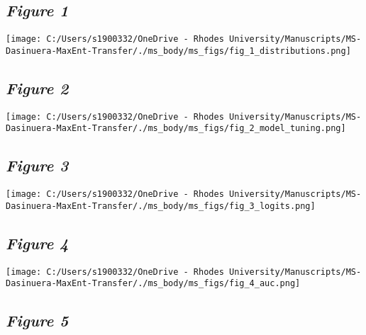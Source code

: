 \documentclass[12pt,]{article}
\begin{document}
\setlength{\parindent}{-0.2in}
\setlength{\leftskip}{0.2in}
\setlength{\parskip}{8pt}
\vspace*{-0.2in}

\noindent

\newpage

\hypertarget{figure-1}{%
\subsection{\texorpdfstring{\emph{Figure 1}}{Figure 1}}\label{figure-1}}

\texttt{[image: C:/Users/s1900332/OneDrive - Rhodes University/Manuscripts/MS-Dasinuera-MaxEnt-Transfer/./ms\_body/ms\_figs/fig\_1\_distributions.png]}

\newpage

\hypertarget{figure-2}{%
\subsection{\texorpdfstring{\emph{Figure 2}}{Figure 2}}\label{figure-2}}

\texttt{[image: C:/Users/s1900332/OneDrive - Rhodes University/Manuscripts/MS-Dasinuera-MaxEnt-Transfer/./ms\_body/ms\_figs/fig\_2\_model\_tuning.png]}

\newpage

\hypertarget{figure-3}{%
\subsection{\texorpdfstring{\emph{Figure 3}}{Figure 3}}\label{figure-3}}

\texttt{[image: C:/Users/s1900332/OneDrive - Rhodes University/Manuscripts/MS-Dasinuera-MaxEnt-Transfer/./ms\_body/ms\_figs/fig\_3\_logits.png]}

\newpage

\hypertarget{figure-4}{%
\subsection{\texorpdfstring{\emph{Figure 4}}{Figure 4}}\label{figure-4}}

\texttt{[image: C:/Users/s1900332/OneDrive - Rhodes University/Manuscripts/MS-Dasinuera-MaxEnt-Transfer/./ms\_body/ms\_figs/fig\_4\_auc.png]}

\newpage

\hypertarget{figure-5}{%
\subsection{\texorpdfstring{\emph{Figure 5}}{Figure 5}}\label{figure-5}}
\end{document}
